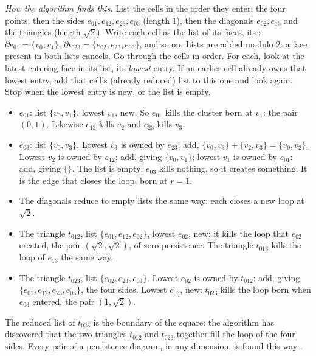 \emph{How the algorithm finds this.} List the cells in the order they enter: the four points, then the sides
$e_{01},e_{12},e_{23},e_{03}$ (length $1$), then the diagonals $e_{02},e_{13}$ and the triangles (length $\sqrt2$).
Write each cell as the list of its faces, its : $\partial e_{01}=\{v_0,v_1\}$,
$\partial t_{023}=\{e_{02},e_{23},e_{03}\}$, and so on. Lists are added modulo $2$: a face present in both lists
cancels. Go through the cells in order. For each, look at the latest-entering face in its list, its
\emph{lowest} entry. If an earlier cell already owns that lowest entry, add that cell's (already reduced) list to
this one and look again. Stop when the lowest entry is new, or the list is empty.
\begin{itemize}[itemsep=1pt,leftmargin=1.2em]
  \item $e_{01}$: list $\{v_0,v_1\}$, lowest $v_1$, new. So $e_{01}$ kills the cluster born at $v_1$: the pair $(0,1)$.
        Likewise $e_{12}$ kills $v_2$ and $e_{23}$ kills $v_3$.
  \item $e_{03}$: list $\{v_0,v_3\}$. Lowest $v_3$ is owned by $e_{23}$: add, $\{v_0,v_3\}+\{v_2,v_3\}=\{v_0,v_2\}$.
        Lowest $v_2$ is owned by $e_{12}$: add, giving $\{v_0,v_1\}$; lowest $v_1$ is owned by $e_{01}$: add, giving
        $\{\}$. The list is empty: $e_{03}$ kills nothing, so it creates something. It is the edge that closes the
        loop, born at $r=1$.
  \item The diagonals reduce to empty lists the same way: each closes a new loop at $\sqrt2$.
  \item The triangle $t_{012}$, list $\{e_{01},e_{12},e_{02}\}$, lowest $e_{02}$, new: it kills the loop that $e_{02}$
        created, the pair $(\sqrt2,\sqrt2)$, of zero persistence. The triangle $t_{013}$ kills the loop of $e_{13}$ the
        same way.
  \item The triangle $t_{023}$, list $\{e_{02},e_{23},e_{03}\}$. Lowest $e_{02}$ is owned by $t_{012}$: add, giving
        $\{e_{01},e_{12},e_{23},e_{03}\}$, the four sides. Lowest $e_{03}$, new: $t_{023}$ kills the loop born when
        $e_{03}$ entered, the pair $(1,\sqrt2)$.
\end{itemize}
The reduced list of $t_{023}$ is the boundary of the square: the algorithm has discovered that the two triangles
$t_{012}$ and $t_{023}$ together fill the loop of the four sides. Every pair of a persistence diagram, in any
dimension, is found this way \cite{Edelsbrunner2002}.


